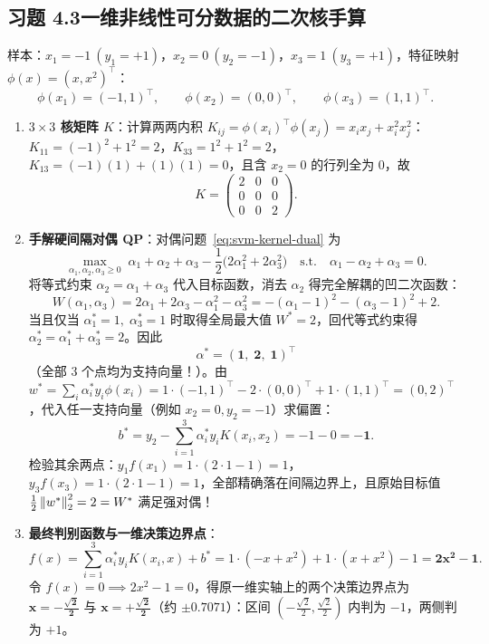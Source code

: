 \subsection*{习题 4.3\quad 一维非线性可分数据的二次核手算}
样本：$x_1 = -1\ (y_1 = +1)$，$x_2 = 0\ (y_2 = -1)$，$x_3 = 1\ (y_3 = +1)$，特征映射 $\phi(x) = (x, x^2)^\top$：
\[
  \phi(x_1) = (-1, 1)^\top, \qquad \phi(x_2) = (0, 0)^\top, \qquad \phi(x_3) = (1, 1)^\top.
\]
\begin{enumerate}[label=(\arabic*), leftmargin=1.8em]
  \item \textbf{$3\times 3$ 核矩阵 $K$}：计算两两内积 $K_{ij} = \phi(x_i)^\top \phi(x_j) = x_i x_j + x_i^2 x_j^2$：
  $K_{11} = (-1)^2 + 1^2 = 2$，$K_{33} = 1^2 + 1^2 = 2$，$K_{13} = (-1)(1) + (1)(1) = 0$，且含 $x_2 = 0$ 的行列全为 $0$，故
  \[
    K = \begin{pmatrix}
      2 & 0 & 0 \\
      0 & 0 & 0 \\
      0 & 0 & 2
    \end{pmatrix}.
  \]
  \item \textbf{手解硬间隔对偶 QP}：对偶问题~\eqref{eq:svm-kernel-dual} 为
  \[
    \max_{\alpha_1, \alpha_2, \alpha_3 \ge 0}\;
    \alpha_1 + \alpha_2 + \alpha_3 - \frac{1}{2}\big(2\alpha_1^2 + 2\alpha_3^2\big)
    \quad\text{s.t.}\quad \alpha_1 - \alpha_2 + \alpha_3 = 0.
  \]
  将等式约束 $\alpha_2 = \alpha_1 + \alpha_3$ 代入目标函数，消去 $\alpha_2$ 得完全解耦的凹二次函数：
  \[
    W(\alpha_1, \alpha_3) = 2\alpha_1 + 2\alpha_3 - \alpha_1^2 - \alpha_3^2
    = -( \alpha_1 - 1 )^2 - ( \alpha_3 - 1 )^2 + 2.
  \]
  当且仅当 $\alpha_1^* = 1,\; \alpha_3^* = 1$ 时取得全局最大值 $W^* = 2$，回代等式约束得 $\alpha_2^* = \alpha_1^* + \alpha_3^* = 2$。因此
  \[
    \alpha^* = \mathbf{(1,\; 2,\; 1)^\top}
  \]
  （全部 3 个点均为支持向量！）。由 $w^* = \sum_i \alpha_i^* y_i \phi(x_i) = 1\cdot(-1,1)^\top - 2\cdot(0,0)^\top + 1\cdot(1,1)^\top = (0, 2)^\top$，代入任一支持向量（例如 $x_2 = 0, y_2 = -1$）求偏置：
  \[
    b^* = y_2 - \sum_{i=1}^3 \alpha_i^* y_i K(x_i, x_2) = -1 - 0 = \mathbf{-1}.
  \]
  检验其余两点：$y_1 f(x_1) = 1\cdot(2\cdot 1 - 1) = 1$，$y_3 f(x_3) = 1\cdot(2\cdot 1 - 1) = 1$，全部精确落在间隔边界上，且原始目标值 $\frac{1}{2}\left\|w^*\right\|_2^2 = 2 = W^*$ 满足强对偶！

  \item \textbf{最终判别函数与一维决策边界点}：
  \[
    f(x) = \sum_{i=1}^3 \alpha_i^* y_i K(x_i, x) + b^*
    = 1\cdot(-x + x^2) + 1\cdot(x + x^2) - 1
    = \mathbf{2x^2 - 1}.
  \]
  令 $f(x) = 0 \implies 2x^2 - 1 = 0$，得原一维实轴上的两个决策边界点为 $\mathbf{x = -\frac{\sqrt{2}}{2}}$ 与 $\mathbf{x = +\frac{\sqrt{2}}{2}}$（约 $\pm 0.7071$）：区间 $(-\frac{\sqrt{2}}{2}, \frac{\sqrt{2}}{2})$ 内判为 $-1$，两侧判为 $+1$。
\end{enumerate}

